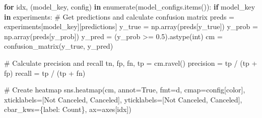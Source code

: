 \documentclass[
  letterpaper,
  DIV=11,
  numbers=noendperiod]{scrartcl}
\newenvironment{Shaded}{\begin{snugshade}}{\end{snugshade}}
\newcommand{\BuiltInTok}[1]{\textcolor[rgb]{0.00,0.23,0.31}{#1}}
\newcommand{\CommentTok}[1]{\textcolor[rgb]{0.37,0.37,0.37}{#1}}
\newcommand{\ControlFlowTok}[1]{\textcolor[rgb]{0.00,0.23,0.31}{\textbf{#1}}}
\newcommand{\FloatTok}[1]{\textcolor[rgb]{0.68,0.00,0.00}{#1}}
\newcommand{\KeywordTok}[1]{\textcolor[rgb]{0.00,0.23,0.31}{\textbf{#1}}}
\newcommand{\NormalTok}[1]{\textcolor[rgb]{0.00,0.23,0.31}{#1}}
\newcommand{\OperatorTok}[1]{\textcolor[rgb]{0.37,0.37,0.37}{#1}}
\newcommand{\StringTok}[1]{\textcolor[rgb]{0.13,0.47,0.30}{#1}}
\newcommand{\VariableTok}[1]{\textcolor[rgb]{0.07,0.07,0.07}{#1}}
\renewenvironment{Shaded}{%
  \begin{tcolorbox}[%
    enhanced,%
    colback=codebg,%
    colframe=codebg,%
    borderline west={3pt}{0pt}{sectionblue},%
    fontupper=\small\ttfamily,%
    boxrule=0pt,%
    arc=0pt,%
    boxsep=5pt,%
    left=2mm,%
    right=2mm,%
    top=2mm,%
    bottom=2mm%
  ]%
}{%
  \end{tcolorbox}%
}
\begin{document}
\begin{Shaded}
\begin{Highlighting}[]
\ControlFlowTok{for}\NormalTok{ idx, (model\_key, config) }\KeywordTok{in} \BuiltInTok{enumerate}\NormalTok{(model\_configs.items()):}
    \ControlFlowTok{if}\NormalTok{ model\_key }\KeywordTok{in}\NormalTok{ experiments:}
        \CommentTok{\# Get predictions and calculate confusion matrix}
\NormalTok{        preds }\OperatorTok{=}\NormalTok{ experiments[model\_key][}\StringTok{\textquotesingle{}predictions\textquotesingle{}}\NormalTok{]}
\NormalTok{        y\_true }\OperatorTok{=}\NormalTok{ np.array(preds[}\StringTok{\textquotesingle{}y\_true\textquotesingle{}}\NormalTok{])}
\NormalTok{        y\_prob }\OperatorTok{=}\NormalTok{ np.array(preds[}\StringTok{\textquotesingle{}y\_prob\textquotesingle{}}\NormalTok{])}
\NormalTok{        y\_pred }\OperatorTok{=}\NormalTok{ (y\_prob }\OperatorTok{\textgreater{}=} \FloatTok{0.5}\NormalTok{).astype(}\BuiltInTok{int}\NormalTok{)}
\NormalTok{        cm }\OperatorTok{=}\NormalTok{ confusion\_matrix(y\_true, y\_pred)}
        
        \CommentTok{\# Calculate precision and recall}
\NormalTok{        tn, fp, fn, tp }\OperatorTok{=}\NormalTok{ cm.ravel()}
\NormalTok{        precision }\OperatorTok{=}\NormalTok{ tp }\OperatorTok{/}\NormalTok{ (tp }\OperatorTok{+}\NormalTok{ fp)}
\NormalTok{        recall }\OperatorTok{=}\NormalTok{ tp }\OperatorTok{/}\NormalTok{ (tp }\OperatorTok{+}\NormalTok{ fn)}
        
        \CommentTok{\# Create heatmap}
\NormalTok{        sns.heatmap(cm, annot}\OperatorTok{=}\VariableTok{True}\NormalTok{, fmt}\OperatorTok{=}\StringTok{\textquotesingle{}d\textquotesingle{}}\NormalTok{, cmap}\OperatorTok{=}\NormalTok{config[}\StringTok{\textquotesingle{}color\textquotesingle{}}\NormalTok{], }
\NormalTok{                    xticklabels}\OperatorTok{=}\NormalTok{[}\StringTok{\textquotesingle{}Not Canceled\textquotesingle{}}\NormalTok{, }\StringTok{\textquotesingle{}Canceled\textquotesingle{}}\NormalTok{],}
\NormalTok{                    yticklabels}\OperatorTok{=}\NormalTok{[}\StringTok{\textquotesingle{}Not Canceled\textquotesingle{}}\NormalTok{, }\StringTok{\textquotesingle{}Canceled\textquotesingle{}}\NormalTok{],}
\NormalTok{                    cbar\_kws}\OperatorTok{=}\NormalTok{\{}\StringTok{\textquotesingle{}label\textquotesingle{}}\NormalTok{: }\StringTok{\textquotesingle{}Count\textquotesingle{}}\NormalTok{\}, ax}\OperatorTok{=}\NormalTok{axes[idx])}
        

\end{Highlighting}
\end{Shaded}
\end{document}
